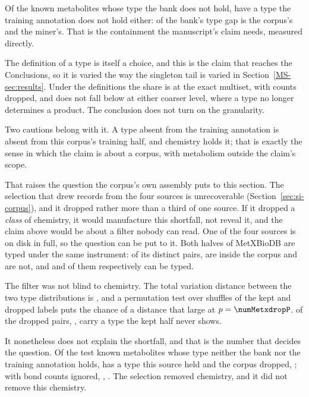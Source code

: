 \documentclass[journal=jcisd8,manuscript=suppinfo,layout=onecolumn]{achemso}
\begin{document}
Of the \numTypeoverlapBanklacks{} known metabolites whose type the bank does not hold,
\numTypeoverlapCorpuslackstoo{} have a type the training annotation does not hold either:
\numTypeoverlapCorpussharePct{} of the bank's type gap is the corpus's and
\numTypeoverlapMinerssharePct{} the miner's. That is the containment the manuscript's claim needs,
measured directly.

The definition of a type is itself a choice, and this is the claim that reaches the Conclusions, so
it is varied the way the singleton tail is varied in Section~\ref{MS-sec:results}. Under the
\numTypeoverlapGranularitiesWord{} definitions the share is
\numTypeoverlapCorpussharePct{} at the exact multiset,
\numTypeoverlapCoarsesharePct{} with counts dropped, and does not fall below
\numTypeoverlapSharemin{} at either coarser level, where a type no longer determines a product.
The conclusion does not turn on the granularity.

Two cautions belong with it. A type absent from the training annotation is absent from this
corpus's training half, and chemistry holds it; that is exactly the sense in which the claim is
about a corpus, with metabolism outside the claim's scope.

That raises the question the corpus's own assembly puts to this section. The selection that drew
records from the four sources is unrecoverable (Section~\ref{sec:si-corpus}), and it dropped
rather more than a third of one source. If it dropped a \emph{class} of chemistry, it would
manufacture this shortfall, not reveal it, and the claim above would be about a filter
nobody can read. One of the four sources is on disk in full, so the question can be put to it.
Both halves of MetXBioDB are typed under the same instrument: of its \numMetxdropPairs{} distinct
pairs, \numMetxdropInside{} are inside the corpus and \numMetxdropDropped{} are not, and
\numMetxdropTypedkept{} and \numMetxdropTypeddropped{} of them respectively can be typed.

The filter was not blind to chemistry. The total variation distance between the two type
distributions is \numMetxdropTv{}, and a permutation test over \numMetxdropPerm{} shuffles of
the kept and dropped labels puts the chance of a distance that large at
$p=\numMetxdropP$. \numMetxdropDroppedtypesabsent{} of the dropped pairs,
\numMetxdropDroppedtypesabsentsharePct{}, carry a type the kept half never shows.

It nonetheless does not explain the shortfall, and that is the number that decides the question.
Of the \numMetxdropAbsentcell{} test known metabolites whose type neither the bank nor the training
annotation holds, \numMetxdropRecoverableWord{} has a type this source held and the corpus
dropped, \numMetxdropRecoverablesharePct{}; with bond counts ignored,
\numMetxdropRecoverablecoarse{}, \numMetxdropRecoverablecoarsesharePct{}. The selection removed
chemistry, and it did not remove this chemistry.
\end{document}
